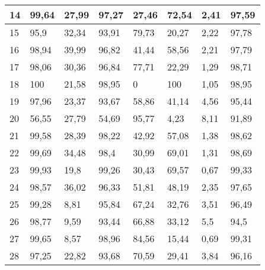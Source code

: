 \begin{longtable}[c]{|l|l|l|l|l|l|l|l|}
14              & 99,64        & 27,99        & 97,27       & 27,46         & 72,54         & 2,41          & 97,59         \\ \hline
15              & 95,9         & 32,34        & 93,91       & 79,73         & 20,27         & 2,22          & 97,78         \\ \hline
16              & 98,94        & 39,99        & 96,82       & 41,44         & 58,56         & 2,21          & 97,79         \\ \hline
17              & 98,06        & 30,36        & 96,84       & 77,71         & 22,29         & 1,29          & 98,71         \\ \hline
18              & 100          & 21,58        & 98,95       & 0             & 100           & 1,05          & 98,95         \\ \hline
19              & 97,96        & 23,37        & 93,67       & 58,86         & 41,14         & 4,56          & 95,44         \\ \hline
20              & 56,55        & 27,79        & 54,69       & 95,77         & 4,23          & 8,11          & 91,89         \\ \hline
21              & 99,58        & 28,39        & 98,22       & 42,92         & 57,08         & 1,38          & 98,62         \\ \hline
22              & 99,69        & 34,48        & 98,4        & 30,99         & 69,01         & 1,31          & 98,69         \\ \hline
23              & 99,93        & 19,8         & 99,26       & 30,43         & 69,57         & 0,67          & 99,33         \\ \hline
24              & 98,57        & 36,02        & 96,33       & 51,81         & 48,19         & 2,35          & 97,65         \\ \hline
25              & 99,28        & 8,81         & 95,84       & 67,24         & 32,76         & 3,51          & 96,49         \\ \hline
26              & 98,77        & 9,59         & 93,44       & 66,88         & 33,12         & 5,5           & 94,5          \\ \hline
27              & 99,65        & 8,57         & 98,96       & 84,56         & 15,44         & 0,69          & 99,31         \\ \hline
28              & 97,25        & 22,82        & 93,68       & 70,59         & 29,41         & 3,84          & 96,16         \\ \hline

\end{longtable}
